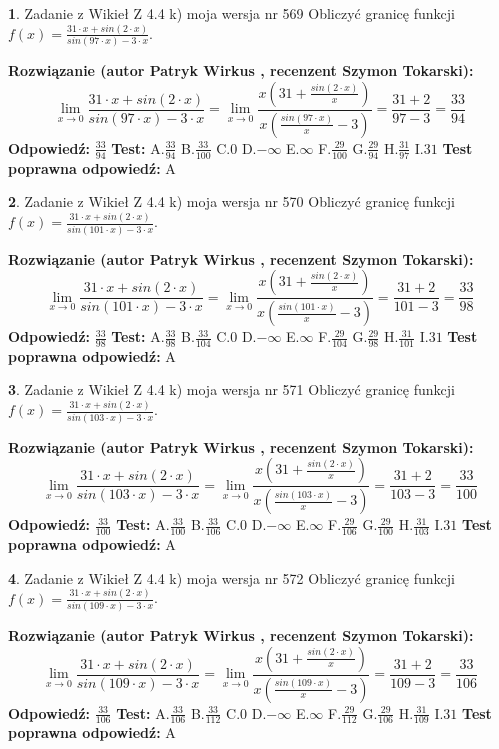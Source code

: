 \documentclass[12pt, a4paper]{article}
\theoremstyle{definition} %
\newtheorem{zad}{}
\newcommand{\zadStart}[1]{\begin{zad}#1\newline}
\newcommand{\zadStop}{\end{zad}}
\newcommand{\rozwStart}[2]{\noindent \textbf{Rozwiązanie (autor #1 , recenzent #2): }\newline}
\newcommand{\rozwStop}{\newline}
\newcommand{\odpStart}{\noindent \textbf{Odpowiedź:}\newline}
\newcommand{\odpStop}{\newline}
\newcommand{\testStart}{\noindent \textbf{Test:}\newline}
\newcommand{\testStop}{\newline}
\newcommand{\kluczStart}{\noindent \textbf{Test poprawna odpowiedź:}\newline}
\newcommand{\kluczStop}{\newline}
\begin{document}
\zadStart{Zadanie z Wikieł Z 4.4 k) moja wersja nr 569}
Obliczyć granicę funkcji $f(x)=\frac{31\cdot x +sin(2\cdot x)}{sin(97\cdot x) -3\cdot x}$.
\zadStop
\rozwStart{Patryk Wirkus}{Szymon Tokarski}
$$\lim\limits_{x\to 0}\frac{31\cdot x +sin(2\cdot x)}{sin(97\cdot x) -3\cdot x}
=\lim\limits_{x\to 0}\frac{x(31+\frac{sin(2\cdot x)}{x})}{x(\frac{sin(97\cdot x)}{x}-3)}
=\frac{31+2}{97-3} = \frac{33}{94}$$
\rozwStop
\odpStart
$\frac{33}{94}$
\odpStop
\testStart
A.$\frac{33}{94}$
B.$\frac{33}{100}$
C.$0$
D.$-\infty$
E.$\infty$
F.$\frac{29}{100}$
G.$\frac{29}{94}$
H.$\frac{31}{97}$
I.$31$
\testStop
\kluczStart
A
\kluczStop



\zadStart{Zadanie z Wikieł Z 4.4 k) moja wersja nr 570}
Obliczyć granicę funkcji $f(x)=\frac{31\cdot x +sin(2\cdot x)}{sin(101\cdot x) -3\cdot x}$.
\zadStop
\rozwStart{Patryk Wirkus}{Szymon Tokarski}
$$\lim\limits_{x\to 0}\frac{31\cdot x +sin(2\cdot x)}{sin(101\cdot x) -3\cdot x}
=\lim\limits_{x\to 0}\frac{x(31+\frac{sin(2\cdot x)}{x})}{x(\frac{sin(101\cdot x)}{x}-3)}
=\frac{31+2}{101-3} = \frac{33}{98}$$
\rozwStop
\odpStart
$\frac{33}{98}$
\odpStop
\testStart
A.$\frac{33}{98}$
B.$\frac{33}{104}$
C.$0$
D.$-\infty$
E.$\infty$
F.$\frac{29}{104}$
G.$\frac{29}{98}$
H.$\frac{31}{101}$
I.$31$
\testStop
\kluczStart
A
\kluczStop



\zadStart{Zadanie z Wikieł Z 4.4 k) moja wersja nr 571}
Obliczyć granicę funkcji $f(x)=\frac{31\cdot x +sin(2\cdot x)}{sin(103\cdot x) -3\cdot x}$.
\zadStop
\rozwStart{Patryk Wirkus}{Szymon Tokarski}
$$\lim\limits_{x\to 0}\frac{31\cdot x +sin(2\cdot x)}{sin(103\cdot x) -3\cdot x}
=\lim\limits_{x\to 0}\frac{x(31+\frac{sin(2\cdot x)}{x})}{x(\frac{sin(103\cdot x)}{x}-3)}
=\frac{31+2}{103-3} = \frac{33}{100}$$
\rozwStop
\odpStart
$\frac{33}{100}$
\odpStop
\testStart
A.$\frac{33}{100}$
B.$\frac{33}{106}$
C.$0$
D.$-\infty$
E.$\infty$
F.$\frac{29}{106}$
G.$\frac{29}{100}$
H.$\frac{31}{103}$
I.$31$
\testStop
\kluczStart
A
\kluczStop



\zadStart{Zadanie z Wikieł Z 4.4 k) moja wersja nr 572}
Obliczyć granicę funkcji $f(x)=\frac{31\cdot x +sin(2\cdot x)}{sin(109\cdot x) -3\cdot x}$.
\zadStop
\rozwStart{Patryk Wirkus}{Szymon Tokarski}
$$\lim\limits_{x\to 0}\frac{31\cdot x +sin(2\cdot x)}{sin(109\cdot x) -3\cdot x}
=\lim\limits_{x\to 0}\frac{x(31+\frac{sin(2\cdot x)}{x})}{x(\frac{sin(109\cdot x)}{x}-3)}
=\frac{31+2}{109-3} = \frac{33}{106}$$
\rozwStop
\odpStart
$\frac{33}{106}$
\odpStop
\testStart
A.$\frac{33}{106}$
B.$\frac{33}{112}$
C.$0$
D.$-\infty$
E.$\infty$
F.$\frac{29}{112}$
G.$\frac{29}{106}$
H.$\frac{31}{109}$
I.$31$
\testStop
\kluczStart
A
\kluczStop
\end{document}
